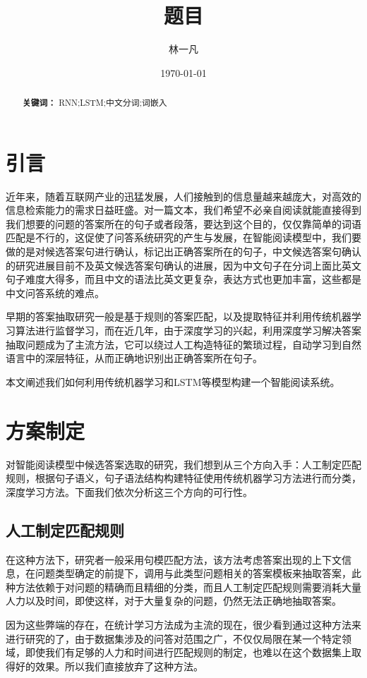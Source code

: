 \documentclass[UTF8]{ctexart}
\title{题目}
\author{林一凡\quad王佳璇\quad万宗祺}
\date{\today}
\begin{document}
\fontsize{12pt}{24pt}
\maketitle
\begin{abstract}
\begin{flushleft}
\textbf{关键词：} RNN;LSTM;中文分词;词嵌入
\end{flushleft}
\end{abstract}

\tableofcontents
\section{引言}
近年来，随着互联网产业的迅猛发展，人们接触到的信息量越来越庞大，对高效的信息检索能力的需求日益旺盛。对一篇文本，我们希望不必亲自阅读就能直接得到我们想要的问题的答案所在的句子或者段落，要达到这个目的，仅仅靠简单的词语匹配是不行的，这促使了问答系统研究的产生与发展，在智能阅读模型中，我们要做的是对候选答案句进行确认，标记出正确答案所在的句子，中文候选答案句确认的研究进展目前不及英文候选答案句确认的进展，因为中文句子在分词上面比英文句子难度大得多，而且中文的语法比英文更复杂，表达方式也更加丰富，这些都是中文问答系统的难点。

早期的答案抽取研究一般是基于规则的答案匹配，以及提取特征并利用传统机器学习算法进行监督学习，而在近几年，由于深度学习的兴起，利用深度学习解决答案抽取问题成为了主流方法，它可以绕过人工构造特征的繁琐过程，自动学习到自然语言中的深层特征，从而正确地识别出正确答案所在句子。

本文阐述我们如何利用传统机器学习和LSTM等模型构建一个智能阅读系统。
\section{方案制定}
对智能阅读模型中候选答案选取的研究，我们想到从三个方向入手：人工制定匹配规则，根据句子语义，句子语法结构构建特征使用传统机器学习方法进行而分类，深度学习方法。下面我们依次分析这三个方向的可行性。
\subsection{人工制定匹配规则}
在这种方法下，研究者一般采用句模匹配方法，该方法考虑答案出现的上下文信息，在问题类型确定的前提下，调用与此类型问题相关的答案模板来抽取答案，此种方法依赖于对问题的精确而且精细的分类，而且人工制定匹配规则需要消耗大量人力以及时间，即使这样，对于大量复杂的问题，仍然无法正确地抽取答案。%

因为这些弊端的存在，在统计学习方法成为主流的现在，很少看到通过这种方法来进行研究的了，由于数据集涉及的问答对范围之广，不仅仅局限在某一个特定领域，即使我们有足够的人力和时间进行匹配规则的制定，也难以在这个数据集上取得好的效果。所以我们直接放弃了这种方法。
\end{document}
